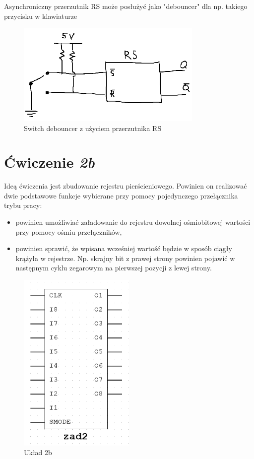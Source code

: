 \documentclass{article}
\begin{document}
\begin{itemize}
    Asynchroniczny przerzutnik RS może posłużyć jako "debouncer" dla np. takiego przycisku w klawiaturze

    \begin{figure}[H]
        \centering
        \includegraphics[width=0.8\textwidth]{debounce.png}
        \caption{Switch debouncer z użyciem przerzutnika RS}
    \end{figure}
    
\end{itemize}


\section{Ćwiczenie \textit{2b}}
Ideą ćwiczenia jest zbudowanie rejestru pierścieniowego. Powinien on realizować dwie podstawowe funkcje 
wybierane przy pomocy pojedynczego przełącznika trybu pracy:
\begin{itemize}
    \item
    powinien umożliwiać załadowanie do rejestru dowolnej ośmiobitowej wartości przy pomocy ośmiu przełączników,
    \item 
    powinien sprawić, że wpisana wcześniej wartość będzie w sposób ciągły krążyła w rejestrze. Np. skrajny bit z prawej strony
    powinien pojawić w następnym cyklu zegarowym na pierwszej pozycji z lewej strony.
\end{itemize}

\begin{figure}[H]
    \centering
    \includegraphics[width=0.5\textwidth]{idea_2.png}
    \caption{Układ 2b}
\end{figure}
\end{document}
